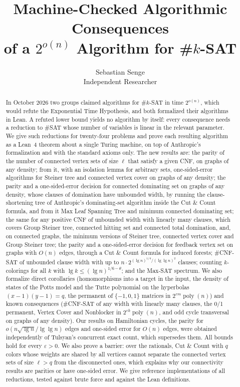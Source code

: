 \documentclass[11pt]{article}
\title{Machine-Checked Algorithmic Consequences\\ of a \texorpdfstring{$2^{o(n)}$}{2\textasciicircum o(n)} Algorithm for \texorpdfstring{\#$k$}{\#k}-SAT}
\author{Sebastian Senge\\ Independent Researcher}
\date{}
\theoremstyle{remark}
\newcommand{\poly}{\operatorname{poly}}
\begin{document}
\maketitle

\begin{abstract}
In October 2026 two groups claimed algorithms for \#$k$-SAT in time $2^{o(n)}$, which would refute
the Exponential Time Hypothesis, and both formalized their algorithms in Lean. A refuted lower bound
yields no algorithm by itself: every consequence needs a reduction to \#SAT whose number of
variables is linear in the relevant parameter. We give such reductions for twenty-four problems and
prove each resulting algorithm as a Lean~4 theorem about a single Turing machine, on top of
Anthropic's formalization and with the standard axioms only. The new results are: the parity of
the number of connected vertex sets of size $\ell$ that satisfy a given CNF, on graphs of any
density; from it, with an isolation lemma for arbitrary sets, one-sided-error algorithms for
Steiner tree and connected vertex cover on graphs of any density; the parity and a one-sided-error
decision for connected dominating set on graphs of any density, whose clauses of domination have
unbounded width, by running the clause-shortening tree of Anthropic's dominating-set algorithm
inside the Cut \& Count formula, and from it Max Leaf Spanning Tree and minimum connected dominating
set; the same for any positive CNF of unbounded width with linearly many clauses, which covers Group
Steiner tree, connected hitting set and connected total domination, and, on connected graphs, the
minimum versions of Steiner tree, connected vertex cover and Group Steiner tree; the parity and a one-sided-error
decision for feedback vertex set on graphs with $O(n)$ edges, through a Cut \& Count formula for
induced forests; \#CNF-SAT of unbounded clause
width with up to $n\cdot 2^{(\lg n)^{1/4}/(\lg\lg n)^2}$ clauses; counting $k$-colorings for all
$k$ with $\lg k\le(\lg n)^{1/6-\theta}$; and the Max-SAT spectrum. We also formalize direct
corollaries (homomorphisms into a target in the input, the density of states of the Potts model and
the Tutte polynomial on the hyperbolas $(x-1)(y-1)=q$, the permanent of $\{-1,0,1\}$ matrices in
$2^{\varepsilon m}\poly(n)$) and known consequences (\#CNF-SAT of any width with linearly many
clauses, the 0/1 permanent, Vertex Cover and Nonblocker in $2^{\varepsilon k}\poly(n)$, and odd cycle transversal on graphs
of any density). Our results
on Hamiltonian cycles, the parity for $o(n\sqrt{\lg n}/\lg\lg n)$ edges and one-sided error for
$O(n)$ edges, were obtained independently of Tulsyan's concurrent exact count, which supersedes
them. All bounds hold for every $\varepsilon>0$. We also prove a barrier: over the rationals, Cut
\& Count with $q$ colors whose weights are shared by all vertices cannot separate the connected
vertex sets of size $\ell>q$ from the disconnected ones, which explains why our connectivity results
are parities or have one-sided error. We
give reference implementations of all reductions, tested against brute force and against the Lean
definitions.

\end{abstract}
\end{document}

